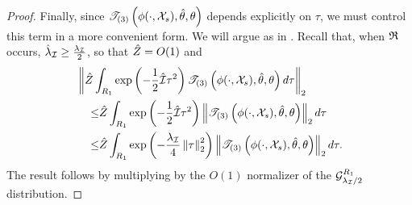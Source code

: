 \begin{lem}
\begin{proof}
Finally, since $\mathscr{T}_{(3)}\left(\phi(\cdot, {\mathcal{X}}_s), \hat\theta, \theta\right)$ depends
explicitly on $\tau$, we must control this term in a more convenient form.  We
will argue as in .   Recall that, when
$\mathfrak{R}$ occurs, $\hat{\lambda}_\mathcal{I} \ge \frac{\lambda_\mathcal{I}}{2}$, so that $\hat{Z} =
O(1)$ and
%
\begin{align*}
%
\MoveEqLeft
\norm{\normalizer \int_{R_1} \exp\left(-\frac{1}{2} \infohat \tau^2 \right)
    \tresid{3}{\phi(\cdot, \xvec_s), \thetahat, \theta} d\tau }_2
\\\le&
\normalizer \int_{R_1} \exp\left(-\frac{1}{2} \infohat \tau^2 \right)
    \norm{\tresid{3}{\phi(\cdot, \xvec_s), \thetahat, \theta}}_2  d\tau
\\ \le&
\normalizer \int_{R_1} \exp\left(-\frac{\infoev}{4} \norm{\tau}_2^2 \right)
    \norm{\tresid{3}{\phi(\cdot, \xvec_s), \thetahat, \theta}}_2  d\tau.
%
\end{align*}
%
The result follows by multiplying by the $O(1)$ normalizer of
the $\mathcal{G}_{\lambda_\mathcal{I} / 2}^{R_1}$ distribution.
%
\end{proof}
%
\end{lem}
